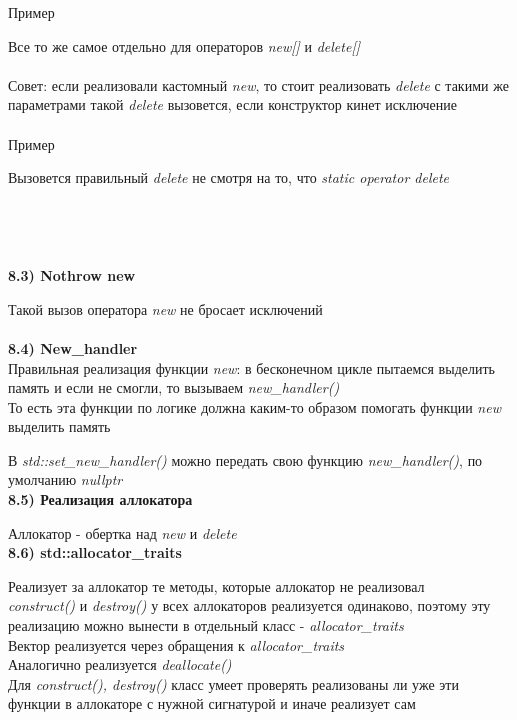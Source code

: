 \documentclass{article}
\begin{document}
Пример

Все то же самое отдельно для операторов \textit{new[]} и \textit{delete[]}\\\\
Совет: если реализовали кастомный \textit{new}, то стоит реализовать \textit{delete} с такими же параметрами такой \textit{delete} вызовется, если конструктор кинет исключение\\\\
Пример

Вызовется правильный \textit{delete} не смотря на то, что \textit{static operator delete}\\\\\\\\\\
\noindent \textbf{8.3) Nothrow new}

Такой вызов оператора \textit{new} не бросает исключений\\\\
\noindent \textbf{8.4) New\_handler}\\
Правильная реализация функции \textit{new}: в бесконечном цикле пытаемся выделить память и если не смогли, то вызываем \textit{new\_handler()}\\
То есть эта функции по логике должна каким-то образом помогать функции \textit{new} выделить память

В \textit{std::set\_new\_handler()} можно передать свою функцию \textit{new\_handler()}, по умолчанию \textit{nullptr}\\

\noindent \textbf{8.5) Реализация аллокатора}

Аллокатор - обертка над \textit{new} и \textit{delete}\\
\noindent \textbf{8.6) std::allocator\_traits}

Реализует за аллокатор те методы, которые аллокатор не реализовал\\
\textit{construct()} и \textit{destroy()} у всех аллокаторов реализуется одинаково, поэтому эту реализацию можно вынести в отдельный класс - \textit{allocator\_traits}\\
Вектор реализуется через обращения к \textit{allocator\_traits}\\

Аналогично реализуется \textit{deallocate()}\\
Для \textit{construct(), destroy()} класс умеет проверять реализованы ли уже эти функции в аллокаторе с нужной сигнатурой и иначе реализует сам
\end{document}
